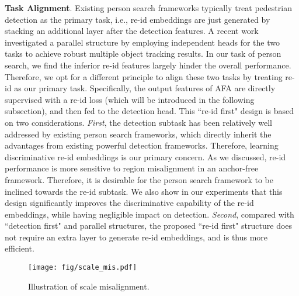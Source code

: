 \documentclass[journal]{IEEEtran}
\begin{document}
\textbf{Task Alignment}. Existing person search frameworks typically treat pedestrian detection as the primary task, i.e., re-id embeddings are just generated by stacking an additional layer after the detection features. A recent work~\cite{DBLP:journals/corr/abs-2004-01888} investigated a parallel structure by employing independent heads for the two tasks to achieve robust multiple object tracking results. In our task of person search, we find the inferior re-id features largely hinder the overall performance. Therefore, we opt for a different principle to align these two tasks by treating re-id as our primary task. Specifically, the output features of AFA are directly supervised with a re-id loss (which will be introduced in the following subsection), and then fed to the detection head. This ``re-id first" design is based on two considerations. \emph{First}, the detection subtask has been relatively well addressed by existing person search frameworks, which directly inherit the advantages from existing powerful detection frameworks. Therefore, learning discriminative re-id embeddings is our primary concern. As we discussed, re-id performance is more sensitive to region misalignment in an anchor-free framework. Therefore, 
it is desirable for the person search framework to be inclined towards the re-id subtask. We also show in our experiments that this design significantly improves the discriminative capability of the re-id embeddings, while having negligible impact on detection. \emph{Second}, compared with ``detection first" and parallel structures, the proposed ``re-id first" structure does not require an extra layer to generate re-id embeddings, and is thus more efficient.

\begin{figure}[t]
\centering
\texttt{[image: fig/scale\_mis.pdf]}
\caption{Illustration of scale misalignment.}\label{fig:sm}
\end{figure}
\end{document}
